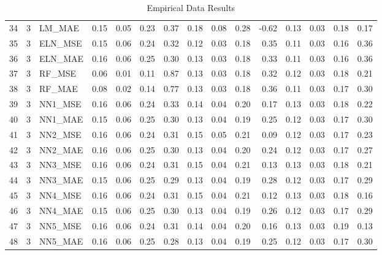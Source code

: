 \begin{table}[ht]
\begin{tabular}{rrlrrrrrrrrrrrr}
  34 &   3 & LM\_MAE & 0.15 & 0.05 & 0.23 & 0.37 & 0.18 & 0.08 & 0.28 & -0.62 & 0.13 & 0.03 & 0.18 & 0.17 \\ 
  35 &   3 & ELN\_MSE & 0.15 & 0.06 & 0.24 & 0.32 & 0.12 & 0.03 & 0.18 & 0.35 & 0.11 & 0.03 & 0.16 & 0.36 \\ 
  36 &   3 & ELN\_MAE & 0.16 & 0.06 & 0.25 & 0.30 & 0.13 & 0.03 & 0.18 & 0.33 & 0.11 & 0.03 & 0.16 & 0.36 \\ 
  37 &   3 & RF\_MSE & 0.06 & 0.01 & 0.11 & 0.87 & 0.13 & 0.03 & 0.18 & 0.32 & 0.12 & 0.03 & 0.18 & 0.21 \\ 
  38 &   3 & RF\_MAE & 0.08 & 0.02 & 0.14 & 0.77 & 0.13 & 0.03 & 0.18 & 0.36 & 0.11 & 0.03 & 0.17 & 0.30 \\ 
  39 &   3 & NN1\_MSE & 0.16 & 0.06 & 0.24 & 0.33 & 0.14 & 0.04 & 0.20 & 0.17 & 0.13 & 0.03 & 0.18 & 0.22 \\ 
  40 &   3 & NN1\_MAE & 0.15 & 0.06 & 0.25 & 0.30 & 0.13 & 0.04 & 0.19 & 0.25 & 0.12 & 0.03 & 0.17 & 0.30 \\ 
  41 &   3 & NN2\_MSE & 0.16 & 0.06 & 0.24 & 0.31 & 0.15 & 0.05 & 0.21 & 0.09 & 0.12 & 0.03 & 0.17 & 0.23 \\ 
  42 &   3 & NN2\_MAE & 0.16 & 0.06 & 0.25 & 0.30 & 0.13 & 0.04 & 0.20 & 0.24 & 0.12 & 0.03 & 0.17 & 0.27 \\ 
  43 &   3 & NN3\_MSE & 0.16 & 0.06 & 0.24 & 0.31 & 0.15 & 0.04 & 0.21 & 0.13 & 0.13 & 0.03 & 0.18 & 0.21 \\ 
  44 &   3 & NN3\_MAE & 0.15 & 0.06 & 0.25 & 0.29 & 0.13 & 0.04 & 0.19 & 0.28 & 0.12 & 0.03 & 0.17 & 0.29 \\ 
  45 &   3 & NN4\_MSE & 0.16 & 0.06 & 0.24 & 0.31 & 0.15 & 0.04 & 0.21 & 0.12 & 0.13 & 0.03 & 0.18 & 0.16 \\ 
  46 &   3 & NN4\_MAE & 0.15 & 0.06 & 0.25 & 0.30 & 0.13 & 0.04 & 0.19 & 0.26 & 0.12 & 0.03 & 0.17 & 0.29 \\ 
  47 &   3 & NN5\_MSE & 0.16 & 0.06 & 0.24 & 0.31 & 0.14 & 0.04 & 0.20 & 0.16 & 0.13 & 0.03 & 0.19 & 0.13 \\ 
  48 &   3 & NN5\_MAE & 0.16 & 0.06 & 0.25 & 0.28 & 0.13 & 0.04 & 0.19 & 0.25 & 0.12 & 0.03 & 0.17 & 0.30 \\ 
   \hline
\end{tabular}
\caption{Empirical Data Results} 
\end{table}
